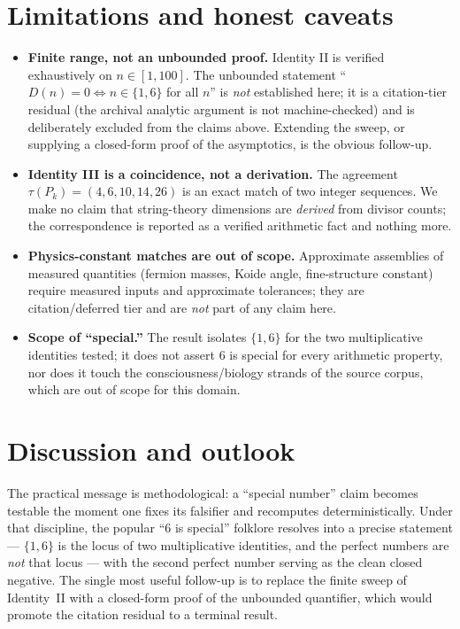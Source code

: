 \documentclass[11pt,a4paper]{article}
\theoremstyle{definition}
\begin{document}
\section{Limitations and honest caveats}
\label{sec:limits}

\begin{itemize}\itemsep0.3em
\item \textbf{Finite range, not an unbounded proof.} Identity II is verified
exhaustively on $n\in[1,100]$. The unbounded statement ``$D(n)=0\iff
n\in\{1,6\}$ for all $n$'' is \emph{not} established here; it is a
citation-tier residual (the archival analytic argument is not machine-checked)
and is deliberately excluded from the claims above. Extending the sweep, or
supplying a closed-form proof of the asymptotics, is the obvious follow-up.
\item \textbf{Identity III is a coincidence, not a derivation.} The agreement
$\tau(P_k)=(4,6,10,14,26)$ is an exact match of two integer sequences. We make
no claim that string-theory dimensions are \emph{derived} from divisor counts;
the correspondence is reported as a verified arithmetic fact and nothing more.
\item \textbf{Physics-constant matches are out of scope.} Approximate
assemblies of measured quantities (fermion masses, Koide angle, fine-structure
constant) require measured inputs and approximate tolerances; they are
citation/deferred tier and are \emph{not} part of any claim here.
\item \textbf{Scope of ``special.''} The result isolates $\{1,6\}$ for the two
multiplicative identities tested; it does not assert $6$ is special for every
arithmetic property, nor does it touch the consciousness/biology strands of the
source corpus, which are out of scope for this domain.
\end{itemize}

\section{Discussion and outlook}
\label{sec:discussion}

The practical message is methodological: a ``special number'' claim becomes
testable the moment one fixes its falsifier and recomputes deterministically.
Under that discipline, the popular ``$6$ is special'' folklore resolves into a
precise statement --- $\{1,6\}$ is the locus of two multiplicative identities,
and the perfect numbers are \emph{not} that locus --- with the second perfect
number serving as the clean closed negative. The single most useful follow-up
is to replace the finite sweep of Identity~II with a closed-form proof of the
unbounded quantifier, which would promote the citation residual to a terminal
result.
\end{document}
